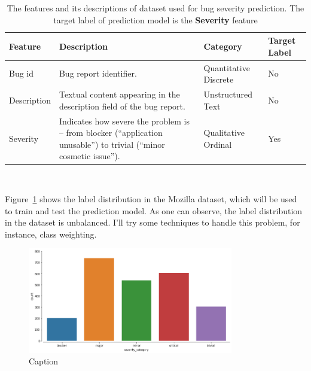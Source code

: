 \documentclass[a4paper]{article}
\begin{document}
\begin{table}[ht!]
    \centering
    \begin{tabular}{@{}p{}p{}p{}p{}@{}}
    \toprule
    {\bf Feature} & {\bf Description} & {\bf Category} & {\bf Target Label}\\
    \midrule
    Bug id                       & Bug report identifier.  & Quantitative Discrete & No\\
    \midrule
    Description                  & Textual content appearing in the description field of the bug report.                                                                               & Unstructured Text & No\\
    \midrule
    Severity                     & Indicates how severe the problem is – from blocker (``application unusable”) to trivial (``minor cosmetic issue”).                                & Qualitative Ordinal & Yes\\
    \bottomrule 
    \end{tabular}
    \caption{The features and its descriptions of dataset used for bug severity prediction. The target label of prediction model is the {\bf Severity} feature }\\
    \label{tab:features_descriptions}
\end{table}

\bigskip
Figure~\ref{fig:severity_class_distribution} shows the label distribution in the Mozilla dataset, which will be used to train and test the prediction model. As one can observe, the label distribution in the dataset is unbalanced. I'll try some techniques to handle this problem, for instance, class weighting\cite{procrastinator:2021}. 
\begin{figure}[ht!]
    \centering
    \includegraphics[width=0.8\textwidth]{figures/severity-labels-distribution.png}
    \caption{Caption}
    \label{fig:severity_class_distribution}
\end{figure}
\end{document}

